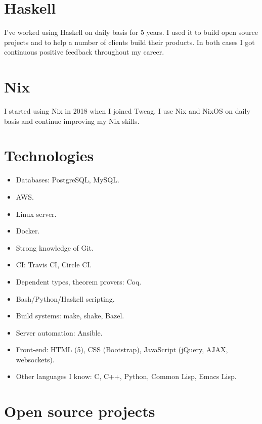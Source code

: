 \documentclass[a4paper,12pt]{article}
\begin{document}
\section*{Haskell}

I've worked using Haskell on daily basis for 5 years. I used it to build
open source projects and to help a number of clients build their products.
In both cases I got continuous positive feedback throughout my career.

\section*{Nix}

I started using Nix in 2018 when I joined Tweag. I use Nix and NixOS on
daily basis and continue improving my Nix skills.

\pagebreak

\section*{Technologies}

\begin{itemize}[noitemsep]
\item Databases: PostgreSQL, MySQL.
\item AWS.
\item Linux server.
\item Docker.
\item Strong knowledge of Git.
\item CI: Travis CI, Circle CI.
\item Dependent types, theorem provers: Coq.
\item Bash/Python/Haskell scripting.
\item Build systems: make, shake, Bazel.
\item Server automation: Ansible.
\item Front-end: HTML (5), CSS (Bootstrap), JavaScript (jQuery, AJAX,
  websockets).
\item Other languages I know: C, C++, Python, Common Lisp, Emacs Lisp.
\end{itemize}

\section*{Open source projects}
\end{document}
